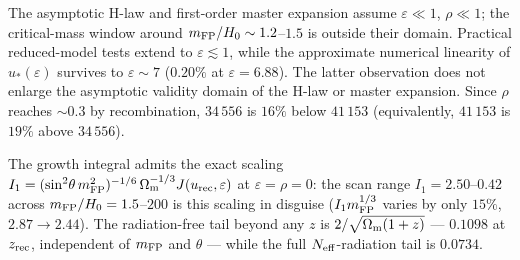 The asymptotic H-law and first-order master expansion assume $\varepsilon\ll1$, $\rho\ll1$; the critical-mass window around $m_{\mathrm{FP}}/H_0\sim1.2$--$1.5$ is outside their domain. Practical reduced-model tests extend to $\varepsilon\lesssim1$, while the approximate numerical linearity of $u_*(\varepsilon)$ survives to $\varepsilon\sim7$ ($0.20\%$ at $\varepsilon=6.88$). The latter observation does not enlarge the asymptotic validity domain of the H-law or master expansion. Since $\rho$ reaches $\sim0.3$ by recombination, $34\,556$ is $16\%$ below $41\,153$ (equivalently, $41\,153$ is $19\%$ above $34\,556$).

The growth integral admits the exact scaling $I_1=(\sin^2\!\theta\,m_{\mathrm{FP}}^2)^{-1/6}\,\Omega_{\mathrm m}^{-1/3}J(u_{\rm rec},\varepsilon)$ at $\varepsilon=\rho=0$: the scan range $I_1=2.50$--$0.42$ across $m_{\mathrm{FP}}/H_0=1.5$--$200$ is this scaling in disguise ($I_1m_{\mathrm{FP}}^{1/3}$ varies by only $15\%$, $2.87\to2.44$). The radiation-free tail beyond any $z$ is $2/\sqrt{\Omega_{\mathrm m}(1+z)}$ --- $0.1098$ at $z_{\rm rec}$, independent of $m_{\mathrm{FP}}$ and $\theta$ --- while the full $N_{\rm eff}$-radiation tail is $0.0734$.
